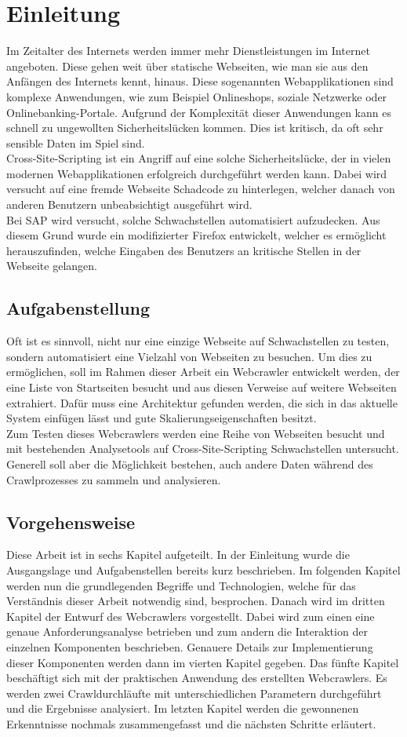 \chapter{Einleitung}
Im Zeitalter des Internets werden immer mehr Dienstleistungen im Internet angeboten. Diese gehen weit über statische Webseiten, wie man sie aus den Anfängen des Internets kennt, hinaus. Diese sogenannten Webapplikationen sind komplexe Anwendungen, wie zum Beispiel Onlineshops, soziale Netzwerke oder Onlinebanking-Portale. Aufgrund der Komplexität dieser Anwendungen kann es schnell zu ungewollten Sicherheitslücken kommen. Dies ist kritisch, da oft sehr sensible Daten im Spiel sind. \\
Cross-Site-Scripting ist ein Angriff auf eine solche Sicherheitslücke, der in vielen modernen Webapplikationen erfolgreich durchgeführt werden kann. Dabei wird versucht auf eine fremde Webseite Schadcode zu hinterlegen, welcher danach von anderen Benutzern unbeabsichtigt ausgeführt wird. \\
Bei SAP wird versucht, solche Schwachstellen automatisiert aufzudecken. Aus diesem Grund wurde ein modifizierter Firefox entwickelt, welcher es ermöglicht herauszufinden, welche Eingaben des Benutzers an kritische Stellen in der Webseite gelangen.
\section{Aufgabenstellung}
Oft ist es sinnvoll, nicht nur eine einzige Webseite auf Schwachstellen zu testen, sondern automatisiert eine Vielzahl von Webseiten zu besuchen. Um dies zu ermöglichen, soll im Rahmen dieser Arbeit ein Webcrawler entwickelt werden, der eine Liste von Startseiten besucht und aus diesen Verweise auf weitere Webseiten extrahiert. Dafür muss eine Architektur gefunden werden, die sich in das aktuelle System einfügen lässt und gute Skalierungseigenschaften besitzt. \\
Zum Testen dieses Webcrawlers werden eine Reihe von Webseiten besucht und mit bestehenden Analysetools auf Cross-Site-Scripting Schwachstellen untersucht. Generell soll aber die Möglichkeit bestehen, auch andere Daten während des Crawlprozesses zu sammeln und analysieren.
\section{Vorgehensweise}
Diese Arbeit ist in sechs Kapitel aufgeteilt. In der Einleitung wurde die Ausgangslage und Aufgabenstellen bereits kurz beschrieben. Im folgenden Kapitel werden nun die grundlegenden Begriffe und Technologien, welche für das Verständnis dieser Arbeit notwendig sind, besprochen. Danach wird im dritten Kapitel der Entwurf des Webcrawlers vorgestellt. Dabei wird zum einen eine genaue Anforderungsanalyse betrieben und zum andern die Interaktion der einzelnen Komponenten beschrieben. Genauere Details zur Implementierung dieser Komponenten werden dann im vierten Kapitel gegeben. Das fünfte Kapitel beschäftigt sich mit der praktischen Anwendung des erstellten Webcrawlers. Es werden zwei Crawldurchläufte mit unterschiedlichen Parametern durchgeführt und die Ergebnisse analysiert. Im letzten Kapitel werden die gewonnenen Erkenntnisse nochmals zusammengefasst und die nächsten Schritte erläutert.
